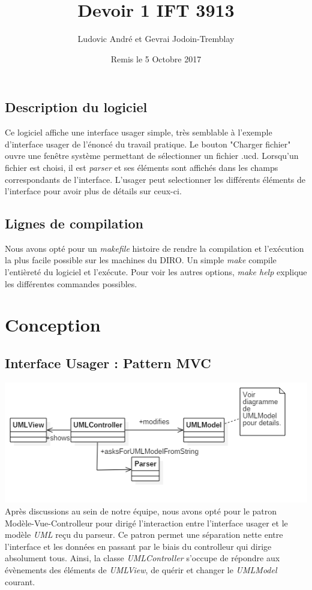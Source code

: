 \documentclass[letter,french]{report}
\begin{document}
	\title{Devoir 1 IFT 3913}
	\author{Ludovic André et Gevrai Jodoin-Tremblay}
	\date{Remis le 5 Octobre 2017}
	\maketitle
	
	
	\subsection*{Description du logiciel}
	Ce logiciel affiche une interface usager simple, très semblable
	à l'exemple d'interface usager de l'énoncé du travail pratique. Le bouton "Charger
	fichier" ouvre une fenêtre système permettant de sélectionner un fichier .ucd.
	Lorsqu'un fichier est choisi, il est \emph{parser} et ses éléments sont affichés dans
	les champs correspondants de l'interface. L'usager peut selectionner les
  différents éléments de l'interface pour avoir plus de détails sur ceux-ci.
	
	\subsection*{Lignes de compilation}
	Nous avons opté pour un \emph{makefile} histoire de rendre la compilation et l'exécution
	la plus facile possible sur les machines du DIRO. Un simple \emph{make} compile
	l'entièreté du logiciel et l'exécute. Pour voir les autres options, \emph{make help}
	explique les différentes commandes possibles.
	
	\section*{Conception}
	
	\subsection*{Interface Usager : Pattern MVC}
	\includegraphics[scale=.7]{images/MVC_diagram.png}
  Après discussions au sein de notre équipe, nous avons opté pour le
  patron Modèle-Vue-Controlleur pour dirigé l'interaction entre l'interface
  usager et le modèle \emph{UML} reçu du parseur. Ce patron permet une
  séparation nette entre l'interface et les données en passant par le biais du
  controlleur qui dirige absolument tous. Ainsi, la classe \emph{UMLController}
  s'occupe de répondre aux évènements des éléments de \emph{UMLView}, de
  quérir et changer le \emph{UMLModel} courant.
\end{document}
